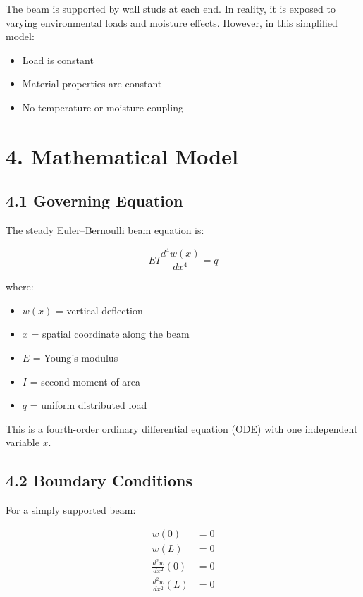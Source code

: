 \documentclass[12pt]{article}
\begin{document}
The beam is supported by wall studs at each end. In reality, it is exposed to varying environmental loads and moisture effects. However, in this simplified model:

\begin{itemize}
\item Load is constant
\item Material properties are constant
\item No temperature or moisture coupling
\end{itemize}

\section*{4. Mathematical Model}

\subsection*{4.1 Governing Equation}

The steady Euler--Bernoulli beam equation is:

\begin{equation}
E I \frac{d^4 w(x)}{dx^4} = q
\end{equation}

where:

\begin{itemize}
\item $w(x)$ = vertical deflection
\item $x$ = spatial coordinate along the beam
\item $E$ = Young's modulus
\item $I$ = second moment of area
\item $q$ = uniform distributed load
\end{itemize}

This is a fourth-order ordinary differential equation (ODE) with one independent variable $x$.

\subsection*{4.2 Boundary Conditions}

For a simply supported beam:

\begin{align}
w(0) &= 0 \\
w(L) &= 0 \\
\frac{d^2 w}{dx^2}(0) &= 0 \\
\frac{d^2 w}{dx^2}(L) &= 0
\end{align}
\end{document}
